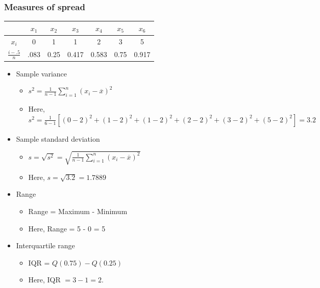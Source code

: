 \documentclass{beamer}\usepackage{graphicx, color}
\providecommand{\ov}[1]{\overline{#1}}
\numberwithin{equation}{section}
\begin{document}
\begin{frame}
\frametitle{Measures of spread}\scriptsize

\begin{center}
\begin{tabular}{c|cccccc}
& $x_1$ & $x_2$ & $x_3$& $x_4$ & $x_5$ & $x_6$  \\ \hline
$x_i$ & 0 & 1 & 1 & 2 & 3 & 5 \\
$\frac{i - .5}{n}$ & .083 & 0.25 & 0.417 & 0.583 & 0.75 & 0.917
\end{tabular}
\end{center} 

\begin{itemize}
\item Sample variance
\begin{itemize}
\item $s^2 = \frac{1}{n-1} \sum_{i = 1}^n (x_i - \ov{x})^2$
\item Here, $s^2 = \frac{1}{6 - 1}[(0-2)^2 + (1-2)^2 + (1-2)^2 + (2-2)^2 + (3-2)^2 + (5-2)^2] = 3.2$
\end{itemize}
\item Sample standard deviation
\begin{itemize}
\item $s = \sqrt{s^2} = \sqrt{ \frac{1}{n-1} \sum_{i = 1}^n (x_i - \ov{x})^2}$
\item Here, $s = \sqrt{3.2} = 1.7889$
\end{itemize}
\item Range
\begin{itemize}
\item Range = Maximum - Minimum
\item Here, Range = 5 - 0 = 5
\end{itemize}
\item Interquartile range
\begin{itemize}
\item IQR = $Q(0.75) - Q(0.25)$
\item Here, IQR $ = 3 - 1 = 2$. 
\end{itemize}
\end{itemize}
\end{frame}
\end{document}
